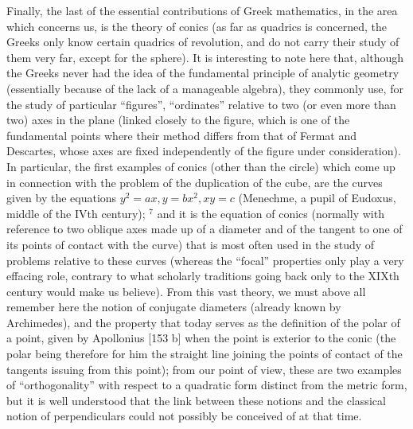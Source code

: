 Finally, the last of the essential contributions of Greek mathematics, in the area which concerns us, is the theory of conics (as far as quadrics is concerned, the Greeks only know certain quadrics of revolution, and do not carry their study of them very far, except for the sphere). It is interesting to note here that, although the Greeks never had the idea of the fundamental principle of analytic geometry (essentially because of the lack of a manageable algebra), they commonly use, for the study of particular ``figures'', ``ordinates'' relative to two (or even more than two) axes in the plane (linked closely to the figure, which is one of the fundamental points where their method differs from that of Fermat and Descartes, whose axes are fixed independently of the figure under consideration). In particular, the first examples of conics (other than the circle) which come up in connection with the problem of the duplication of the cube, are the curves given by the equations \(y^{2}=ax, y=bx^{2}, xy=c\) (Menechme, a pupil of Eudoxus, middle of the IVth century); \(^{7}\) and it is the equation of conics (normally with reference to two oblique axes made up of a diameter and of the tangent to one of its points of contact with the curve) that is most often used in the study of problems relative to these curves (whereas the ``focal'' properties only play a very effacing role, contrary to what scholarly traditions going back only to the XIXth century would make us believe). From this vast theory, we must above all remember here the notion of conjugate diameters (already known by Archimedes), and the property that today serves as the definition of the polar of a point, given by Apollonius {[}153 b{]} when the point is exterior to the conic (the polar being therefore for him the straight line joining the points of contact of the tangents issuing from this point); from our point of view, these are two examples of ``orthogonality'' with respect to a quadratic form distinct from the metric form, but it is well understood that the link between these notions and the classical notion of perpendiculars could not possibly be conceived of at that time.

